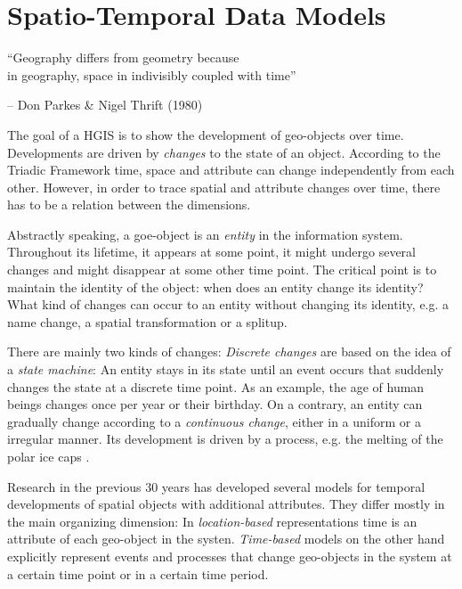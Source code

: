 


\section{Spatio-Temporal Data Models} %
\label{sec:spatio_temporal_data_models}

\begin{quoteit}
  ``Geography differs from geometry because \\
  in geography, space in indivisibly coupled with time''
\end{quoteit}
\hfill -- Don Parkes \& Nigel Thrift (1980)

The goal of a HGIS is to show the development of geo-objects over time. Developments are driven by \emph{changes} to the state of an object. According to the Triadic Framework time, space and attribute can change independently from each other. However, in order to trace spatial and attribute changes over time, there has to be a relation between the dimensions.

Abstractly speaking, a goe-object is an \emph{entity} in the information system. Throughout its lifetime, it appears at some point, it might undergo several changes and might disappear at some other time point. The critical point is to maintain the identity of the object: when does an entity change its identity? What kind of changes can occur to an entity without changing its identity, e.g. a name change, a spatial transformation or a splitup.

There are mainly two kinds of changes: \emph{Discrete changes} are based on the idea of a \emph{state machine}: An entity stays in its state until an event occurs that suddenly changes the state at a discrete time point. As an example, the age of human beings changes once per year or their birthday. On a contrary, an entity can gradually change according to a \emph{continuous change}, either in a uniform or a irregular manner. Its development is driven by a process, e.g. the melting of the polar ice caps
\cite{peuquet99}.

Research in the previous 30 years has developed several models for temporal developments of spatial objects with additional attributes. They differ mostly in the main organizing dimension: In \emph{location-based} representations time is an attribute of each geo-object in the systen. \emph{Time-based} models on the other hand explicitly represent events and processes that change geo-objects in the system at a certain time point or in a certain time period.


